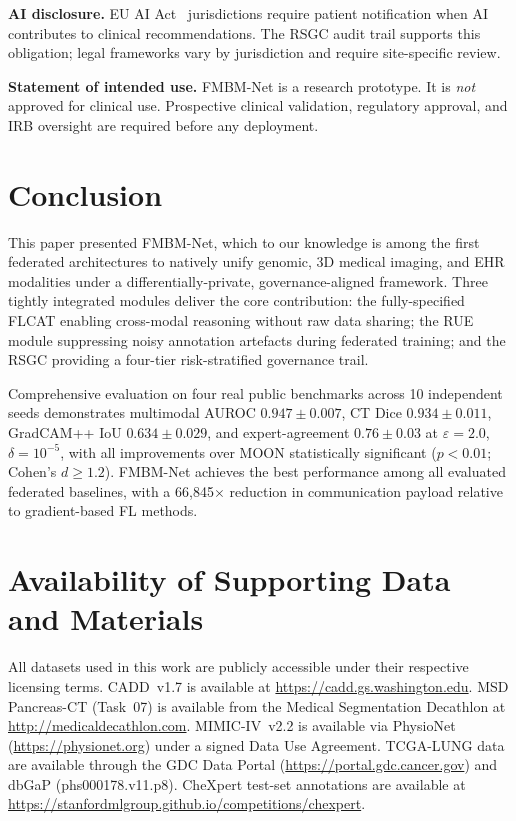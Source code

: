 \documentclass{ieeeaccess}
\begin{document}
\textbf{AI disclosure.} EU AI Act~\cite{eu_ai_act_2024} jurisdictions
require patient notification when AI contributes to clinical recommendations.
The RSGC audit trail supports this obligation; legal frameworks vary by
jurisdiction and require site-specific review.

\textbf{Statement of intended use.} FMBM-Net is a research prototype.
It is \emph{not} approved for clinical use. Prospective clinical validation,
regulatory approval, and IRB oversight are required before any deployment.

\section{Conclusion}
\label{sec:conclusion}

This paper presented FMBM-Net, which to our knowledge is among the first
federated architectures to natively unify genomic, 3D medical imaging, and
EHR modalities under a differentially-private, governance-aligned framework.
Three tightly integrated modules deliver the core contribution: the
fully-specified FLCAT enabling cross-modal reasoning without raw data sharing;
the RUE module suppressing noisy annotation artefacts during federated
training; and the RSGC providing a four-tier risk-stratified governance trail.

Comprehensive evaluation on four real public benchmarks across 10 independent
seeds demonstrates multimodal AUROC $0.947\!\pm\!0.007$, CT Dice
$0.934\!\pm\!0.011$, GradCAM++ IoU $0.634\!\pm\!0.029$, and expert-agreement
$0.76\!\pm\!0.03$ at $\varepsilon\!=\!2.0$, $\delta\!=\!10^{-5}$, with all
improvements over MOON statistically significant ($p\!<\!0.01$; Cohen's
$d\!\geq\!1.2$). FMBM-Net achieves the best performance among all evaluated
federated baselines, with a 66,845$\times$ reduction in communication payload
relative to gradient-based FL methods.




\section{Availability of Supporting Data and Materials}
\label{sec:data_avail}

All datasets used in this work are publicly accessible under their
respective licensing terms. CADD~v1.7 is available at
\url{https://cadd.gs.washington.edu}. MSD Pancreas-CT (Task~07) is available
from the Medical Segmentation Decathlon at
\url{http://medicaldecathlon.com}. MIMIC-IV~v2.2 is available via
PhysioNet (\url{https://physionet.org}) under a signed Data Use Agreement.
TCGA-LUNG data are available through the GDC Data Portal
(\url{https://portal.gdc.cancer.gov}) and dbGaP (phs000178.v11.p8).
CheXpert test-set annotations are available at
\url{https://stanfordmlgroup.github.io/competitions/chexpert}.
\end{document}

